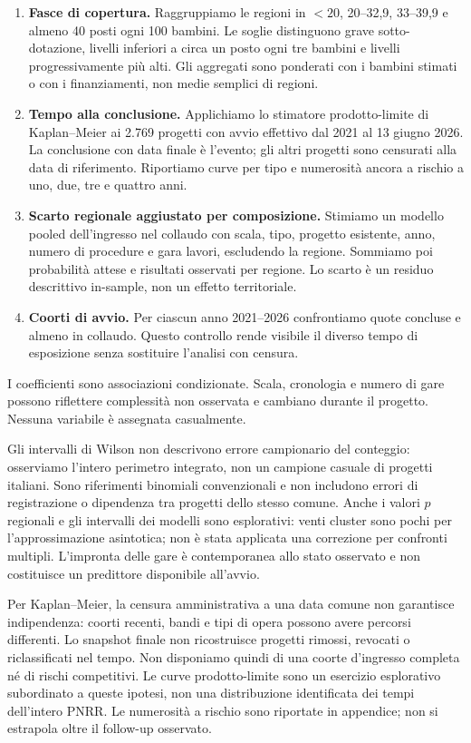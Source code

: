 \documentclass[10pt,a4paper]{article}
\begin{document}
\begin{enumerate}
  \item \textbf{Fasce di copertura.} Raggruppiamo le regioni in $<20$, 20--32,9, 33--39,9 e almeno 40 posti ogni 100 bambini. Le soglie distinguono grave sotto-dotazione, livelli inferiori a circa un posto ogni tre bambini e livelli progressivamente più alti. Gli aggregati sono ponderati con i bambini stimati o con i finanziamenti, non medie semplici di regioni.
  \item \textbf{Tempo alla conclusione.} Applichiamo lo stimatore prodotto-limite di Kaplan--Meier ai 2.769 progetti con avvio effettivo dal 2021 al 13 giugno 2026. La conclusione con data finale è l'evento; gli altri progetti sono censurati alla data di riferimento. Riportiamo curve per tipo e numerosità ancora a rischio a uno, due, tre e quattro anni.
  \item \textbf{Scarto regionale aggiustato per composizione.} Stimiamo un modello pooled dell'ingresso nel collaudo con scala, tipo, progetto esistente, anno, numero di procedure e gara lavori, escludendo la regione. Sommiamo poi probabilità attese e risultati osservati per regione. Lo scarto è un residuo descrittivo in-sample, non un effetto territoriale.
  \item \textbf{Coorti di avvio.} Per ciascun anno 2021--2026 confrontiamo quote concluse e almeno in collaudo. Questo controllo rende visibile il diverso tempo di esposizione senza sostituire l'analisi con censura.
\end{enumerate}

I coefficienti sono associazioni condizionate. Scala, cronologia e numero di gare possono riflettere complessità non osservata e cambiano durante il progetto. Nessuna variabile è assegnata casualmente.

Gli intervalli di Wilson non descrivono errore campionario del conteggio: osserviamo l'intero perimetro integrato, non un campione casuale di progetti italiani. Sono riferimenti binomiali convenzionali e non includono errori di registrazione o dipendenza tra progetti dello stesso comune. Anche i valori $p$ regionali e gli intervalli dei modelli sono esplorativi: venti cluster sono pochi per l'approssimazione asintotica; non è stata applicata una correzione per confronti multipli. L'impronta delle gare è contemporanea allo stato osservato e non costituisce un predittore disponibile all'avvio.

Per Kaplan--Meier, la censura amministrativa a una data comune non garantisce indipendenza: coorti recenti, bandi e tipi di opera possono avere percorsi differenti. Lo snapshot finale non ricostruisce progetti rimossi, revocati o riclassificati nel tempo. Non disponiamo quindi di una coorte d'ingresso completa né di rischi competitivi. Le curve prodotto-limite sono un esercizio esplorativo subordinato a queste ipotesi, non una distribuzione identificata dei tempi dell'intero PNRR. Le numerosità a rischio sono riportate in appendice; non si estrapola oltre il follow-up osservato.
\end{document}
